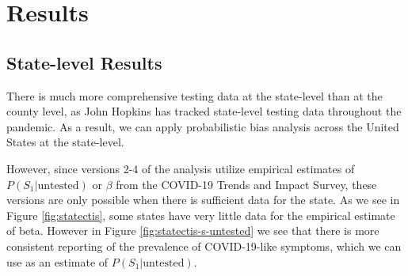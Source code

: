 \documentclass[12pt,twoside]{smiththesis}
\begin{document}
\hypertarget{res}{%
\chapter{Results}\label{res}}

\hypertarget{state-level-results}{%
\section{State-level Results}\label{state-level-results}}

There is much more comprehensive testing data at the state-level than at the county level, as John Hopkins has tracked state-level testing data throughout the pandemic.
As a result, we can apply probabilistic bias analysis across the United States at the state-level.

However, since versions 2-4 of the analysis utilize empirical estimates of \(P(S_1|\text{untested})\) or \(\beta\) from the COVID-19 Trends and Impact Survey, these versions are only possible when there is sufficient data for the state. As we see in Figure \ref{fig:statectis}, some states have very little data for the empirical estimate of beta. However in Figure \ref{fig:statectis-s-untested} we see that there is more consistent reporting of the prevalence of COVID-19-like symptoms, which we can use as an estimate of \(P(S_1|\text{untested})\).
\end{document}
